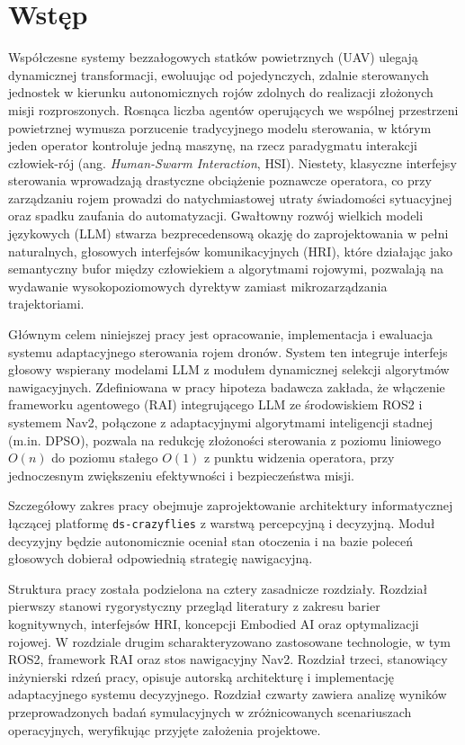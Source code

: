 \chapter*{Wstęp}

Współczesne systemy bezzałogowych statków powietrznych (UAV) ulegają dynamicznej transformacji, ewoluując od pojedynczych, zdalnie sterowanych jednostek w kierunku autonomicznych rojów zdolnych do realizacji złożonych misji rozproszonych. Rosnąca liczba agentów operujących we wspólnej przestrzeni powietrznej wymusza porzucenie tradycyjnego modelu sterowania, w którym jeden operator kontroluje jedną maszynę, na rzecz paradygmatu interakcji człowiek-rój (ang. \textit{Human-Swarm Interaction}, HSI). Niestety, klasyczne interfejsy sterowania wprowadzają drastyczne obciążenie poznawcze operatora, co przy zarządzaniu rojem prowadzi do natychmiastowej utraty świadomości sytuacyjnej oraz spadku zaufania do automatyzacji. Gwałtowny rozwój wielkich modeli językowych (LLM) stwarza bezprecedensową okazję do zaprojektowania w pełni naturalnych, głosowych interfejsów komunikacyjnych (HRI), które działając jako semantyczny bufor między człowiekiem a algorytmami rojowymi, pozwalają na wydawanie wysokopoziomowych dyrektyw zamiast mikrozarządzania trajektoriami.

Głównym celem niniejszej pracy jest opracowanie, implementacja i ewaluacja systemu adaptacyjnego sterowania rojem dronów. System ten integruje interfejs głosowy wspierany modelami LLM z modułem dynamicznej selekcji algorytmów nawigacyjnych. Zdefiniowana w pracy hipoteza badawcza zakłada, że włączenie frameworku agentowego (RAI) integrującego LLM ze środowiskiem ROS2 i systemem Nav2, połączone z adaptacyjnymi algorytmami inteligencji stadnej (m.in. DPSO), pozwala na redukcję złożoności sterowania z poziomu liniowego $O(n)$ do poziomu stałego $O(1)$ z punktu widzenia operatora, przy jednoczesnym zwiększeniu efektywności i bezpieczeństwa misji.

Szczegółowy zakres pracy obejmuje zaprojektowanie architektury informatycznej łączącej platformę \texttt{ds-crazyflies} z warstwą percepcyjną i decyzyjną. Moduł decyzyjny będzie autonomicznie oceniał stan otoczenia i na bazie poleceń głosowych dobierał odpowiednią strategię nawigacyjną. 

Struktura pracy została podzielona na cztery zasadnicze rozdziały. Rozdział pierwszy stanowi rygorystyczny przegląd literatury z zakresu barier kognitywnych, interfejsów HRI, koncepcji Embodied AI oraz optymalizacji rojowej. W rozdziale drugim scharakteryzowano zastosowane technologie, w tym ROS2, framework RAI oraz stos nawigacyjny Nav2. Rozdział trzeci, stanowiący inżynierski rdzeń pracy, opisuje autorską architekturę i implementację adaptacyjnego systemu decyzyjnego. Rozdział czwarty zawiera analizę wyników przeprowadzonych badań symulacyjnych w zróżnicowanych scenariuszach operacyjnych, weryfikując przyjęte założenia projektowe.